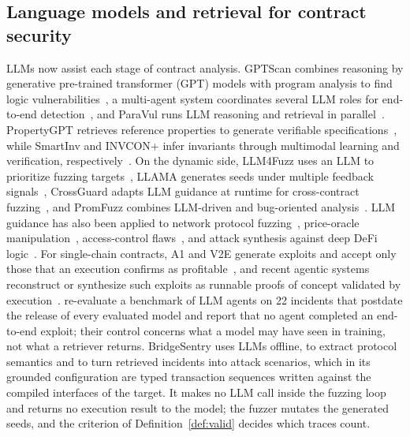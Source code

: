 \documentclass[a4paper]{cas-sc}
\begin{document}
\subsection{Language models and retrieval for contract security}

LLMs now assist each stage of contract analysis. GPTScan combines reasoning by generative pre-trained transformer (GPT) models with program analysis to find logic vulnerabilities~\citep{sun2024gptscan}, a multi-agent system coordinates several LLM roles for end-to-end detection~\citep{wei2025advanced}, and ParaVul runs LLM reasoning and retrieval in parallel~\citep{huang2026paravul}. PropertyGPT retrieves reference properties to generate verifiable specifications~\citep{liu2025propertygpt}, while SmartInv and INVCON+ infer invariants through multimodal learning and verification, respectively~\citep{wang2024smartinv, liu2025invcon}. On the dynamic side, LLM4Fuzz uses an LLM to prioritize fuzzing targets~\citep{shou2024llm4fuzz}, LLAMA generates seeds under multiple feedback signals~\citep{gai2026llama}, CrossGuard adapts LLM guidance at runtime for cross-contract fuzzing~\citep{ali2025crossguard}, and PromFuzz combines LLM-driven and bug-oriented analysis~\citep{lin2025promfuzz}. LLM guidance has also been applied to network protocol fuzzing~\citep{meng2024llmguided}, price-oracle manipulation~\citep{gao2026airaclex}, access-control flaws~\citep{chen2026trace}, and attack synthesis against deep DeFi logic~\citep{wen2024foray}. For single-chain contracts, A1 and V2E generate exploits and accept only those that an execution confirms as profitable~\citep{gervais2025a1, zhang2026v2e}, and recent agentic systems reconstruct or synthesize such exploits as runnable proofs of concept validated by execution~\citep{wang2026txray, liang2026evopoc}. \citet{peng2026reevmbench} re-evaluate a benchmark of LLM agents on 22 incidents that postdate the release of every evaluated model and report that no agent completed an end-to-end exploit; their control concerns what a model may have seen in training, not what a retriever returns. BridgeSentry uses LLMs offline, to extract protocol semantics and to turn retrieved incidents into attack scenarios, which in its grounded configuration are typed transaction sequences written against the compiled interfaces of the target. It makes no LLM call inside the fuzzing loop and returns no execution result to the model; the fuzzer mutates the generated seeds, and the criterion of Definition~\ref{def:valid} decides which traces count.
\end{document}
